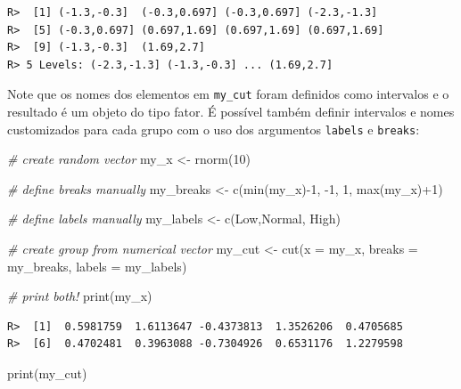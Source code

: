 \documentclass[
  11pt,
]{book}
\newenvironment{Shaded}{\begin{snugshade}}{\end{snugshade}}
\newcommand{\AttributeTok}[1]{\textcolor[rgb]{0.61,0.61,0.61}{#1}}
\newcommand{\CommentTok}[1]{\textcolor[rgb]{0.37,0.37,0.37}{\textit{#1}}}
\newcommand{\DecValTok}[1]{\textcolor[rgb]{0.06,0.06,0.06}{#1}}
\newcommand{\FunctionTok}[1]{\textcolor[rgb]{0,0,0}{#1}}
\newcommand{\NormalTok}[1]{#1}
\newcommand{\OtherTok}[1]{\textcolor[rgb]{0.37,0.37,0.37}{#1}}
\newcommand{\SpecialCharTok}[1]{\textcolor[rgb]{0,0,0}{#1}}
\newcommand{\StringTok}[1]{\textcolor[rgb]{0.5,0.5,0.5}{#1}}
\begin{document}
\begin{verbatim}
R>  [1] (-1.3,-0.3]  (-0.3,0.697] (-0.3,0.697] (-2.3,-1.3] 
R>  [5] (-0.3,0.697] (0.697,1.69] (0.697,1.69] (0.697,1.69]
R>  [9] (-1.3,-0.3]  (1.69,2.7]  
R> 5 Levels: (-2.3,-1.3] (-1.3,-0.3] ... (1.69,2.7]
\end{verbatim}

Note que os nomes dos elementos em \texttt{my\_cut} foram definidos como intervalos e o resultado é um objeto do tipo fator. É possível também definir intervalos e nomes customizados para cada grupo com o uso dos argumentos \texttt{labels} e \texttt{breaks}:

\begin{Shaded}
\begin{Highlighting}[]
\CommentTok{\# create random vector}
\NormalTok{my\_x }\OtherTok{\textless{}{-}} \FunctionTok{rnorm}\NormalTok{(}\DecValTok{10}\NormalTok{)}

\CommentTok{\# define breaks manually}
\NormalTok{my\_breaks }\OtherTok{\textless{}{-}} \FunctionTok{c}\NormalTok{(}\FunctionTok{min}\NormalTok{(my\_x)}\SpecialCharTok{{-}}\DecValTok{1}\NormalTok{, }\SpecialCharTok{{-}}\DecValTok{1}\NormalTok{, }\DecValTok{1}\NormalTok{, }\FunctionTok{max}\NormalTok{(my\_x)}\SpecialCharTok{+}\DecValTok{1}\NormalTok{)}

\CommentTok{\# define labels manually}
\NormalTok{my\_labels }\OtherTok{\textless{}{-}} \FunctionTok{c}\NormalTok{(}\StringTok{\textquotesingle{}Low\textquotesingle{}}\NormalTok{,}\StringTok{\textquotesingle{}Normal\textquotesingle{}}\NormalTok{, }\StringTok{\textquotesingle{}High\textquotesingle{}}\NormalTok{)}

\CommentTok{\# create group from numerical vector}
\NormalTok{my\_cut }\OtherTok{\textless{}{-}} \FunctionTok{cut}\NormalTok{(}\AttributeTok{x =}\NormalTok{ my\_x, }\AttributeTok{breaks =}\NormalTok{ my\_breaks, }\AttributeTok{labels =}\NormalTok{ my\_labels)}

\CommentTok{\# print both!}
\FunctionTok{print}\NormalTok{(my\_x)}
\end{Highlighting}
\end{Shaded}

\begin{verbatim}
R>  [1]  0.5981759  1.6113647 -0.4373813  1.3526206  0.4705685
R>  [6]  0.4702481  0.3963088 -0.7304926  0.6531176  1.2279598
\end{verbatim}

\begin{Shaded}
\begin{Highlighting}[]
\FunctionTok{print}\NormalTok{(my\_cut)}
\end{Highlighting}
\end{Shaded}
\end{document}
